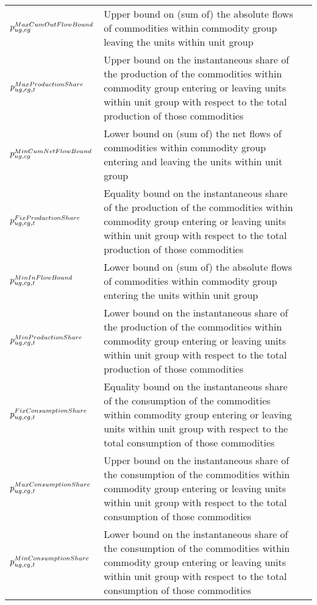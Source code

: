 \begin{longtable}{p{\cola} p{\colc} >{\small\raggedleft\arraybackslash\itshape}p{\colb}}
		$p^{MaxCumOutFlowBound}_{ug,cg}$	& Upper bound on (sum of) the absolute flows of commodities within commodity group \commoditygroup leaving the units within unit group \unitgroup 	&                \\
		$p^{MaxProductionShare}_{ug,cg,t}$	& Upper bound on the instantaneous share of the production of the commodities within commodity group \commoditygroup entering or leaving units within unit group \unitgroup with respect to the total production of those commodities	&                \\
		$p^{MinCumNetFlowBound}_{ug,cg}$	& Lower bound on (sum of) the net flows of commodities within commodity group \commoditygroup entering and leaving the units within unit group \unitgroup 	&                \\
		$p^{FixProductionShare}_{ug,cg,t}$	& Equality bound on the instantaneous share of the production of the commodities within commodity group \commoditygroup entering or leaving units within unit group \unitgroup with respect to the total production of those commodities	&                \\
		$p^{MinInFlowBound}_{ug,cg,t}$	& Lower bound on (sum of) the absolute flows of commodities within commodity group \commoditygroup entering the units within unit group \unitgroup 	&                \\
		$p^{MinProductionShare}_{ug,cg,t}$	& Lower bound on the instantaneous share of the production of the commodities within commodity group \commoditygroup entering or leaving units within unit group \unitgroup with respect to the total production of those commodities	&                \\
		$p^{FixConsumptionShare}_{ug,cg,t}$	& Equality bound on the instantaneous share of the consumption of the commodities within commodity group \commoditygroup entering or leaving units within unit group \unitgroup with respect to the total consumption of those commodities	&                \\
		$p^{MaxConsumptionShare}_{ug,cg,t}$	& Upper bound on the instantaneous share of the consumption of the commodities within commodity group \commoditygroup entering or leaving units within unit group \unitgroup with respect to the total consumption of those commodities	&                \\
		$p^{MinConsumptionShare}_{ug,cg,t}$	& Lower bound on the instantaneous share of the consumption of the commodities within commodity group \commoditygroup entering or leaving units within unit group \unitgroup with respect to the total consumption of those commodities	&                \\

\end{longtable}
